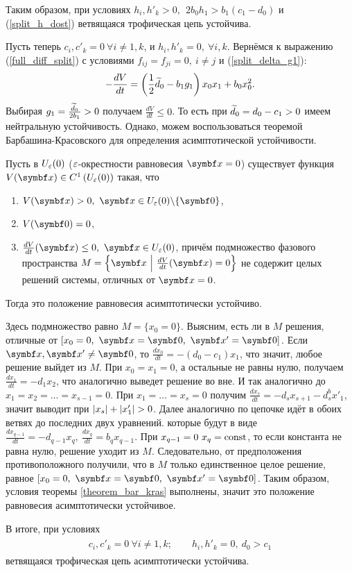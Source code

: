Таким образом, при условиях \(h_i, h'_k > 0, ~~ 2 b_0 h_1 > b_1 (c_1 - d_0)\) и (\ref{split_h_dost}) ветвящаяся трофическая цепь устойчива.

Пусть теперь \(c_i, c'_k = 0 ~ \forall i \neq 1, k \), и \(h_i, h'_k = 0, ~ \forall i, k \). Вернёмся к выражению (\ref{full_diff_split}) с условиями \(f_{ij} = f_{ji} = 0, ~ i \neq j\) и (\ref{split_delta_g1}):
\begin{equation}
    - \frac{dV}{dt} = \left( \frac{1}{2} \widetilde{d}_0 - b_1 g_1 \right) x_0 x_1 + b_0 x_0^2.
\end{equation}
Выбирая \(g_1 = \frac{\widetilde{d}_0}{2 b_1} > 0\) получаем \(\frac{dV}{dt} \leq 0\). То есть при \(\widetilde{d}_0 = d_0 - c_1 > 0\) имеем нейтральную устойчивость. Однако, можем воспользоваться теоремой Барбашина-Красовского\cite{barabashin_stability} для определения асимптотической устойчивости.

\begin{theorem} \label{theorem_bar_kras}
    Пусть в \(U_\varepsilon(0)\) (\(\varepsilon\)-окрестности равновесия \(\mb{x} = 0\)) существует функция \(V(\mb{x}) \in C^1\left( U_\veps(0) \right)\) такая, что
    \begin{enumerate}
        \item \(V(\mb{x}) > 0, ~ \mb{x} \in U_\veps(0) \backslash \{\mb{0}\}\),
        \item \(V(\mb{0}) = 0\),
        \item \(\frac{dV}{dt}(\mb{x}) \leq 0, ~ \mb{x} \in U_\veps(0) \), причём подмножество фазового пространства \( M = \left\{ \mb{x} ~ \Big\vert ~ \frac{dV}{dt}(\mb{x}) = 0 \right\} \) не содержит целых решений системы, отличных от \(\mb{x} = 0\).
    \end{enumerate}
    Тогда это положение равновесия асимптотически устойчиво.
\end{theorem}

Здесь подмножество равно \( M = \{ x_0 = 0 \} \). Выясним, есть ли в \(M\) решения, отличные от \( [x_0 = 0, ~ \mb{x} = \mb{0}, ~ \mb{x'} = \mb{0}] \). Если \( \mb{x}, \mb{x'} \neq \mb{0} \), то \(\frac{dx_0}{dt} = -(d_0 - c_1) x_1\), что значит, любое решение выйдет из \(M\). При \(x_0 = x_1 = 0\), а остальные не равны нулю, получаем \(\frac{dx_1}{dt} = -d_1 x_2\), что аналогично выведет решение во вне. И так аналогично до \( x_1 = x_2 = \dots = x_{s-1} = 0 \). При \(x_1 = \dots = x_{s} = 0\) получим \( \frac{d x_s}{dt} = -d_{s} x_{s+1} - d^b_s x'_1 \), значит выводит при \( \left\vert x_s \right\vert + \left\vert x'_1 \right\vert > 0\). Далее аналогично по цепочке идёт в обоих ветвях до последних двух уравнений. которые будут в виде \(\frac{dx_{q-1}}{dt} = -d_{q-1} x_q, ~ \frac{d x_q}{dt} = b_q x_{q-1}\). При \(x_{q-1} = 0 ~ x_q = \operatorname{const} \), то если константа не равна нулю, решение уходит из \(M\). Следовательно, от предположения противоположного получили, что в \(M\) только единственное целое решение, равное \( [x_0 = 0, ~ \mb{x} = \mb{0}, ~ \mb{x'} = \mb{0}] \). Таким образом, условия теоремы \eqref{theorem_bar_kras} выполнены, значит это положение равновесия асимптотически устойчивое.

В итоге, при условиях
\begin{align} \label{split_lin_stab}
    \begin{split}
        c_i, c'_k = 0 ~ \forall i \neq 1, k; \qquad h_i, h'_k = 0, ~ d_0 > c_1
    \end{split}
\end{align}
ветвящаяся трофическая цепь асимптотически устойчива.
